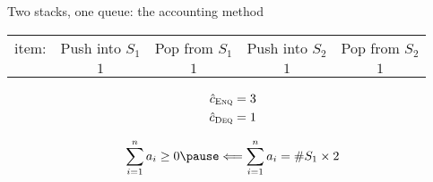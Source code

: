 \begin{frame}{Two stacks, one queue: the accounting method}
  \begin{table}
    \begin{tabular}{ccccc}
	  item: & Push into $S_1$ & Pop from $S_1$ & Push into $S_2$ & Pop from $S_2$ \\
	  & $1$ & $1$ & $1$ & $1$
    \end{tabular}
  \end{table}


  \pause
  \begin{align*}
	\hat{c}_{\textsc{Enq}} &= 3 \\
	\hat{c}_{\textsc{Deq}} &= 1 \\
  \end{align*}

  \pause
  \[ 
    \sum_{i=1}^{n} a_i \ge 0 \pause \Longleftarrow \sum_{i=1}^{n} a_i = \#S_1 \times 2
  \]
\end{frame}
